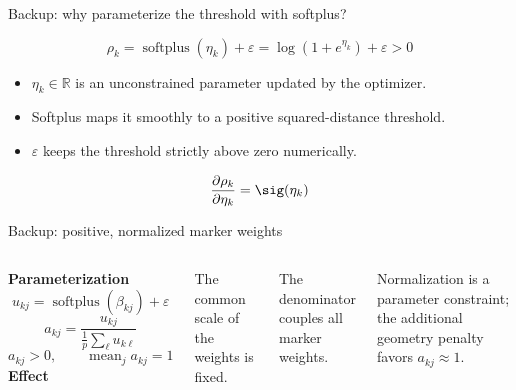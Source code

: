 \begin{frame}{Backup: why parameterize the threshold with softplus?}

\[\rho_k=\operatorname{softplus}(\eta_k)+\varepsilon
=\log(1+e^{\eta_k})+\varepsilon>0\]
\begin{itemize}
\item $\eta_k\in\mathbb R$ is an unconstrained parameter updated by the optimizer.
\item Softplus maps it smoothly to a positive squared-distance threshold.
\item $\varepsilon$ keeps the threshold strictly above zero numerically.
\end{itemize}
\[\frac{\partial\rho_k}{\partial\eta_k}=\sig(\eta_k)\]

\end{frame}

\begin{frame}{Backup: positive, normalized marker weights}

\begin{columns}[T,onlytextwidth]
\textbf{Parameterization}
\[u_{kj}=\operatorname{softplus}(\beta_{kj})+\varepsilon\]
\[a_{kj}=\frac{u_{kj}}{\frac1p\sum_\ell u_{k\ell}}\]
\[a_{kj}>0,\qquad \operatorname{mean}_j a_{kj}=1\]
\textbf{Effect}\par
The common scale of the weights is fixed.\par
\vspace{3mm}
The denominator couples all marker weights.\par
\vspace{3mm}
Normalization is a parameter constraint; the additional geometry penalty favors $a_{kj}\approx1$.
\end{columns}

\end{frame}
